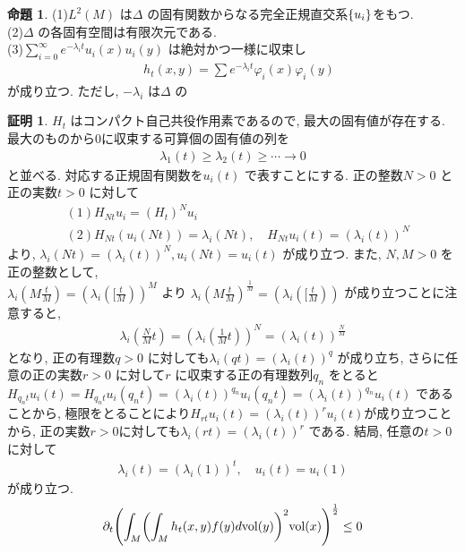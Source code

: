 \documentclass[10pt, fleqn, label-section=none]{bxjsarticle}
\theoremstyle{definition}
\newtheorem{prop}[dfn]{命題}
\newtheorem*{pf*}{証明}
\newcommand{\paren}[1]{\mleft( #1\mright )}
\newcommand{\cbra}[1]{\mleft\{#1\mright\}}
\newcommand{\vol}{\textrm{vol}}
\renewcommand{\-}{\hyphen}
\begin{document}
\begin{prop}
(1)$L^2(M)$ は$\Delta$ の固有関数からなる完全正規直交系$\cbra{u_i}$をもつ. \\
(2)$\Delta$ の各固有空間は有限次元である. \\
(3)$\sum_{i = 0}^\infty e^{-\lambda_i t} u_i (x) u_i (y)$ は絶対かつ一様に収束し
\begin{align*}\quad  h_t (x,y) = \sum e^{- \lambda_i t} \varphi_i (x) \varphi_i (y)  \end{align*}
\quad が成り立つ. ただし, $-\lambda_i$ は$\Delta$ の
\end{prop}
\begin{pf*}
$H_t$ はコンパクト自己共役作用素であるので, 最大の固有値が存在する. 最大のものから$0$に収束する可算個の固有値の列を
\begin{align*} \lambda_1 (t) \geq \lambda_2 (t) \geq \cdots \rightarrow 0 \end{align*}
と並べる. 対応する正規固有関数を$u_i (t)$ で表すことにする. 正の整数$N > 0$ と正の実数$t > 0$ に対して
\begin{align*} &(1)H_{Nt} u_i = (H_{t} )^N u_i  \\ &(2) H_{Nt} (u_i (Nt)) = \lambda_i (Nt), \quad H_{Nt}u_i (t) = (\lambda_i (t)) ^ N \end{align*}
より, $\lambda_i (Nt) = (\lambda_i (t)) ^N , u_i (Nt) = u_i (t) $ が成り立つ. また, $N, M>0$ を正の整数として, \\$\lambda_i (M \frac{t}{M}) = (\lambda_i ([\frac{t}{M}))^M$ より
$\lambda_i (M \frac{t}{M})^{\frac{1}{M}} = (\lambda_i ([\frac{t}{M}))$ が成り立つことに注意すると, 
\begin{align*} \lambda_i (\frac{N}{M} t) = (\lambda_i (\frac{1}{M} t))^ N = (\lambda_i(t) ) ^ \frac{N}{M}  \end{align*}
となり, 正の有理数$q>0$ に対しても$\lambda_i (qt) = (\lambda_i (t)) ^q$ が成り立ち, さらに任意の正の実数$r > 0$ に対して$r$ に収束する正の有理数列$q_n$ をとると
$H_{q_n t } u_i(t) = H_{q_n t } u_i(q_n t) = (\lambda_i (t)) ^{q_n} u_i (q_n t) = (\lambda_i (t)) ^{q_n} u_i (t) $ であることから, 極限をとることにより$H_{rt } u_i(t) =(\lambda_i (t)) ^{r} u_i (t)  $が成り立つことから, 正の実数$r>0$に対しても$\lambda_i (rt)  = (\lambda_i (t)) ^{r} $ である. 結局, 任意の$t>0$ に対して
\begin{align*} \lambda_i (t) = (\lambda_i (1) )^t , \quad u_i(t) = u_i (1)\end{align*}
が成り立つ. 
\begin{align*} \partial_t \paren{ \int_M \paren{ \int_M h_t (x,y) f(y) d\vol(y)} ^2  \vol(x) }^{\frac{1}{2}} \leq 0  \end{align*}

\end{pf*}
\end{document}

